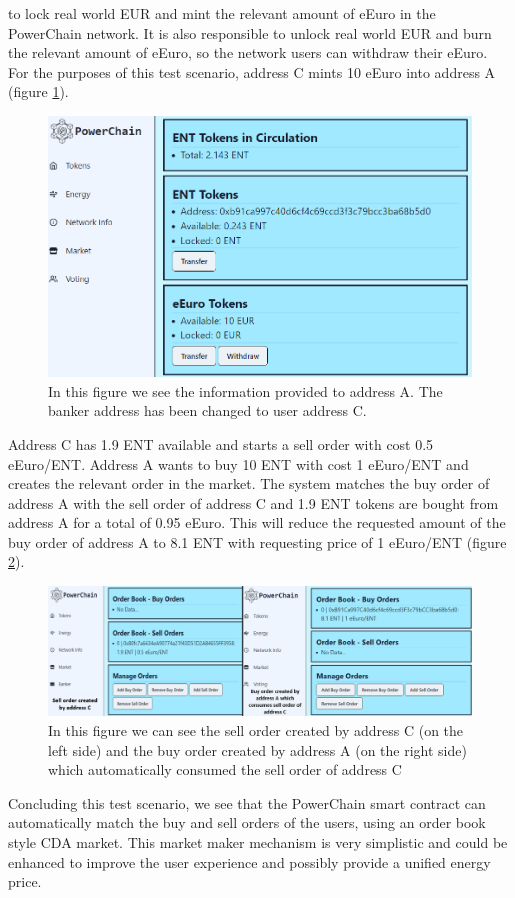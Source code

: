 to lock real world EUR and mint the relevant amount of eEuro in the PowerChain network. It is also responsible to unlock real world EUR and burn the relevant amount of eEuro, so the network users
can withdraw their eEuro. For the purposes of this test scenario, address C mints 10 eEuro into address A (figure \ref{fig:eEuro_minted}).\\ 
\begin{figure}[h!]
    \centering
    \includegraphics[width=\linewidth,frame,scale=0.7]{Figures/eEuro_minted.png}
    \caption{In this figure we see the information provided to address A. The banker address has been changed to user address C.}
    \label{fig:eEuro_minted}
\end{figure}
Address C has 1.9 ENT available and starts a sell order with cost 0.5 eEuro/ENT. Address A wants to buy 10 ENT with cost 1 eEuro/ENT and creates the relevant order in the market.
The system matches the buy order of address A with the sell order of address C and 1.9 ENT tokens are bought from address A for a total of 0.95 eEuro. This will reduce the requested
amount of the buy order of address A to 8.1 ENT with requesting price of 1 eEuro/ENT (figure \ref{fig:order_book}).\\ 
\begin{figure}[h!]
    \centering
    \includegraphics[width=\linewidth,frame,scale=1]{Figures/order_book.png}
    \caption{In this figure we can see the sell order created by address C (on the left side) and the buy order created by address A (on the right side) which automatically consumed the sell
    order of address C}
    \label{fig:order_book}
\end{figure}
Concluding this test scenario, we see that the PowerChain smart contract can automatically match the buy and sell orders of the users, using an order book style CDA market. This market maker mechanism
is very simplistic and could be enhanced to improve the user experience and possibly provide a unified energy price.

